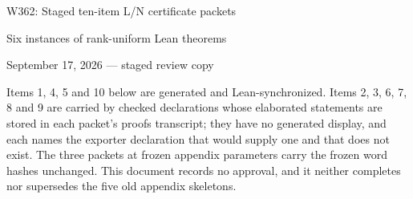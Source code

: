 \documentclass[10pt,letterpaper]{article}
\begin{document}
\begin{center}
{\LARGE W362: Staged ten-item L/N certificate packets}\par
{\large Six instances of rank-uniform Lean theorems}\par
September 17, 2026 --- staged review copy
\end{center}
Items 1, 4, 5 and 10 below are generated and Lean-synchronized. Items 2, 3, 6, 7, 8
and 9 are carried by checked declarations whose elaborated statements are stored in
each packet's proofs transcript; they have no generated display, and each names the
exporter declaration that would supply one and that does not exist. The three packets
at frozen appendix parameters carry the frozen word hashes unchanged. This document
records no approval, and it neither completes nor supersedes the five old appendix
skeletons.

\clearpage

\clearpage

\clearpage

\clearpage

\clearpage

\end{document}
